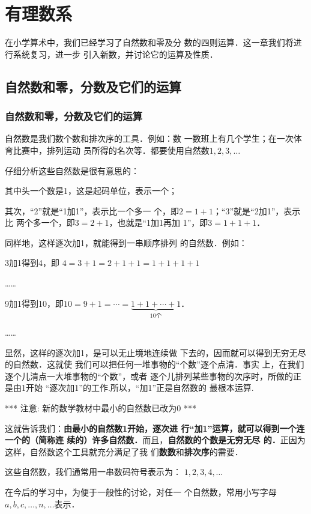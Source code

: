 \chapter{有理数系}

在小学算术中，我们已经学习了自然数和零及分
数的四则运算．这一章我们将进行系统复习，进一步
引入新数，并讨论它的运算及性质．

\section{自然数和零，分数及它们的运算}

\subsection{自然数和零，分数及它们的运算}

自然数是我们数个数和排次序的工具．例如：数
一数班上有几个学生；在一次体育比赛中，排列运动
员所得的名次等．都要使用自然数$1,  2,  3,\ldots$

仔细分析这些自然数是很有意思的：

其中头一个数是1，这是起码单位，表示一个；

其次，“2”就是“1加1”，表示比一个多一
个，即$2=1+1$；“3”就是“2加1”，表示比
两个多一个，即$3=2+1$，也就是“1加1再加
1”，即$3=1+1+1$．

同样地，这样逐次加1，就能得到一串顺序排列
的自然数．例如：  

3加1得到4，即
$4=3+1=2+1+1=1+1+1+1$

……

9加1得到10，即$10= 9+1=\cdots=\underbrace{1+1+\cdots+1}_{10\text{个}}$．

……

显然，这样的逐次加1，是可以无止境地连续做
下去的，因而就可以得到无穷无尽的自然数．这就使
我们可以把任何一堆事物的“个数”逐个点清．事实
上，在我们逐个儿清点一大堆事物的“个数”，或者
逐个儿排列某些事物的次序时，所做的正是由1开始
“逐次加1”的工作.所以，“加1”正是自然数的
最根本运算.

{\color{red}*** 注意:  新的数学教材中最小的自然数已改为0 ***}

这就告诉我们：\textbf{由最小的自然数1开始，逐次进
	行“加1”运算，就可以得到一个连一个的（简称连
	续的）许多自然数．}而且，\textbf{自然数的个数是无穷无尽
	的．}正因为这样，自然数这个工具就充分满足了我
们\textbf{数数}和\textbf{排次序}的需要．

这些自然数，我们通常用一串数码符号表示为：
$1,2,3,4,\ldots$

在今后的学习中，为便于一般性的讨论，对任一
个自然数，常用小写字母$a,b,c,\ldots,n,\ldots$表示．

